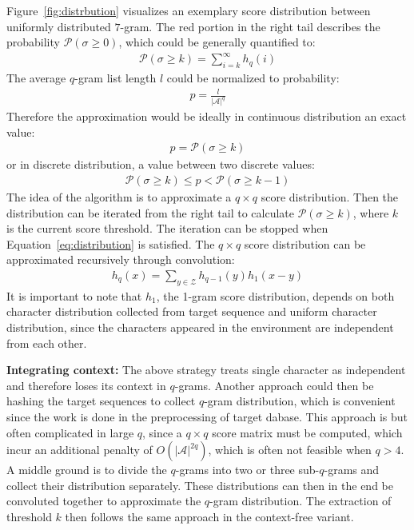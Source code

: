 \documentclass[twoside,a4paper,bsc]{master}
\newcommand{\Qgram}[1]{\(#1\)-gram}
\newcommand{\Alpha}[0]{\mathcal{A}}
\begin{document}
Figure~\ref{fig:distrbution} visualizes an exemplary score distribution
between uniformly distributed \Qgram{7}. The red portion in the right
tail describes the probability \(\mathcal{P}(\sigma \geq 0)\), which could
be generally quantified to:
\begin{align}
\mathcal{P}(\sigma \geq k) = \sum_{i = k}^\infty h_q(i)
\end{align}
The average \Qgram{q} list length \(l\) could be normalized to
probability:
\begin{align}
p = \frac{l}{|\Alpha|^q}
\end{align}
Therefore the approximation would be ideally in continuous distribution an
exact value:
\begin{align}
p = \mathcal{P}(\sigma \geq k)
\end{align}
or in discrete distribution, a value between two discrete values:
\begin{align}
\mathcal{P}(\sigma \geq k) \leq p < \mathcal{P}(\sigma \geq
k-1)\label{eq:distribution}
\end{align}
The idea of the algorithm is to approximate a \(q\times q\) score
distribution. Then the distribution can be iterated from the right tail to
calculate \(\mathcal{P}(\sigma \geq k)\), where \(k\) is the current score
threshold. The iteration can be stopped when Equation~\ref{eq:distribution}
is satisfied.
The \(q\times q\) score distribution can be approximated recursively
through convolution:
\begin{align}
h_{q}(x) = \sum_{y\in\mathcal{Z}} h_{q-1}(y)h_1(x-y)
\label{equation:convolution}
\end{align}
It is important to note that \(h_1\), the 1-gram score distribution,
depends on both character distribution collected from target sequence and
uniform character distribution, since the characters appeared in the
environment are independent from each other.

\textbf{Integrating context:} The above strategy treats single character as
independent and therefore loses its context in \Qgram{q}s. Another
approach could then be hashing the target sequences to collect \Qgram{q}
distribution, which is convenient since the work is done in the
preprocessing of target dabase. This approach is but often complicated in
large \(q\), since a \(q\times q\) score matrix must be computed, which
incur an additional penalty of \(O(|\Alpha|^{2q})\), which is often
not feasible when \(q>4\). A middle ground is to divide the \Qgram{q}s
into two or three sub-\Qgram{q}s and collect their distribution
separately. These distributions can then in the end be convoluted together
to approximate the \Qgram{q} distribution. The extraction of threshold
\(k\) then follows the same approach in the context-free variant.
\end{document}
